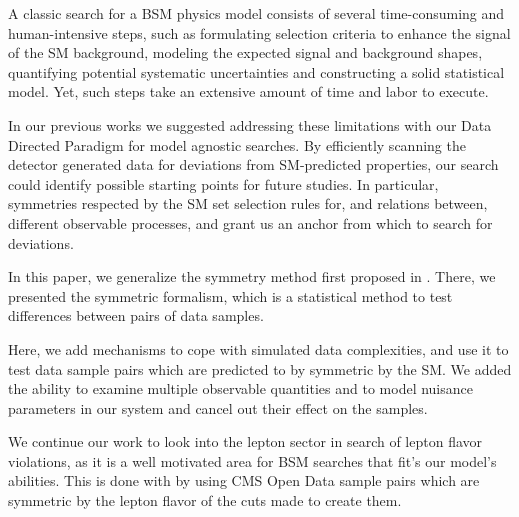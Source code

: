 \documentclass[../ddppaper2.tex]{subfiles}
\begin{document}
A classic search for a BSM physics model \cite{ATLAS_Higgs_2012} consists of several time-consuming and human-intensive steps, such as formulating selection criteria to enhance the signal of the SM background, modeling the expected signal and background shapes, quantifying potential systematic uncertainties and constructing a solid statistical model. Yet, such steps take an extensive amount of time and labor to execute. 

In our previous works \cite{Volkovich_2022_DDP, Birman_2022_Symmetries, LastDDPPaper} we suggested addressing these limitations with our Data Directed Paradigm for model agnostic searches. By efficiently scanning the detector generated data for deviations from SM-predicted properties, our search could identify possible starting points for future studies. In particular, symmetries respected by the SM set selection rules for, and relations between, different observable processes, and grant us an anchor from which to search for deviations. 

In this paper, we generalize the symmetry method first proposed in \cite{LastDDPPaper}. There, we presented the symmetric formalism, which is a statistical method to test differences between pairs of data samples.

Here, we add mechanisms to cope with simulated data complexities, and use it to test data sample pairs which are predicted to by symmetric by the SM. We added the ability to examine multiple observable quantities and to model nuisance parameters in our system and cancel out their effect on the samples.

We continue our work to look into the lepton sector in search of lepton flavor violations, as it is a well motivated area for BSM searches that fit's our model's abilities. This is done with by using CMS Open Data sample pairs which are symmetric by the lepton flavor of the cuts made to create them.
\end{document}
